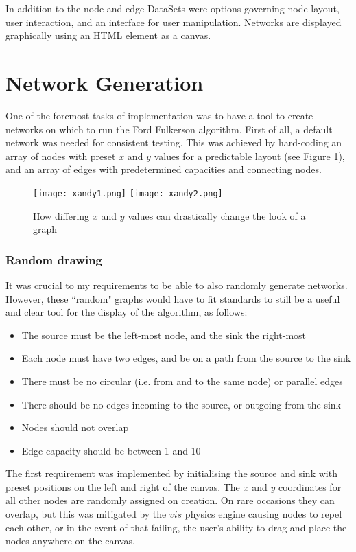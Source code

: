 \documentclass{l4proj}
\begin{document}
In addition to the node and edge DataSets were options governing node layout, user interaction, and an interface for user manipulation. Networks are displayed graphically using an HTML element as a canvas.
\begin{comment}
TODO table of functions used frequently with DataSets

\end{comment}

\section{Network Generation}
One of the foremost tasks of implementation was to have a tool to create networks on which to run the Ford Fulkerson algorithm. First of all, a default network was needed for consistent testing. This was achieved by hard-coding an array of nodes with preset $x$ and $y$ values for a predictable layout (see Figure \ref{fig:xandy}), and an array of edges with predetermined capacities and connecting nodes.
\begin{figure}[h]
\centering
\texttt{[image: xandy1.png]}
\texttt{[image: xandy2.png]}
\caption{How differing $x$ and $y$ values can drastically change the look of a graph}
\label{fig:xandy}
\end{figure}

\subsubsection{Random drawing} \label{randomise}
It was crucial to my requirements to be able to also randomly generate networks. However, these ``random" graphs would have to fit standards to still be a useful and clear tool for the display of the algorithm, as follows:
\begin{itemize}[noitemsep]
	\item The source must be the left-most node, and the sink the right-most
    \item Each node must have two edges, and be on a path from the source to the sink
    \item There must be no circular (i.e. from and to the same node) or parallel edges
    \item There should be no edges incoming to the source, or outgoing from the sink
    \item Nodes should not overlap
    \item Edge capacity should be between 1 and 10
\end{itemize}
The first requirement was implemented by initialising the source and sink with preset positions on the left and right of the canvas. The $x$ and $y$ coordinates for all other nodes are randomly assigned on creation. On rare occasions they can overlap, but this was mitigated by the $vis$ physics engine causing nodes to repel each other, or in the event of that failing, the user's ability to drag and place the nodes anywhere on the canvas.
\end{document}
